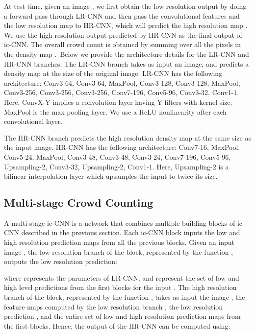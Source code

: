 \documentclass[runningheads]{llncs}
\begin{document}
At test time, given an image , we first obtain the low resolution output  by doing a forward pass through LR-CNN and then pass the convolutional features and the low resolution map  to HR-CNN, which will predict the high resolution map  . We use the high resolution output predicted by HR-CNN as the final output of ic-CNN. The overall crowd count is obtained by summing over all the pixels in the density map .\
\newline Below we provide the architecture details for the LR-CNN and HR-CNN branches.
\newline
{} The LR-CNN branch takes as input an image, and predicts a density map at  the size of the original image. LR-CNN has the following architecture:
Conv3-64, Conv3-64, MaxPool, Conv3-128, Conv3-128, MaxPool, Conv3-256, Conv3-256, Conv3-256, Conv7-196, Conv5-96, Conv3-32, Conv1-1. Here, ConvX-Y implies a convolution layer having Y filters with  kernel size. MaxPool is the max pooling layer. We use a ReLU nonlinearity after each convolutional layer.

The HR-CNN branch predicts the high resolution density map at the same size as the input image. HR-CNN has the following architecture:
Conv7-16, MaxPool, Conv5-24, MaxPool, Conv3-48, Conv3-48, Conv3-24, Conv7-196, Conv5-96, Upsampling-2, Conv3-32, Upsampling-2, Conv1-1. Here, Upsampling-2 is a bilinear interpolation layer which upsamples the input to twice its size.
\subsection{Multi-stage Crowd Counting}\label{sec:ic-CNN}
A multi-stage ic-CNN is a network that combines multiple building blocks of ic-CNN described in the previous section. Each ic-CNN block inputs the low and high resolution prediction maps from all the previous blocks. Given an input image , the low resolution branch of the  block, represented by the function , outputs the low resolution prediction:

where  represents the parameters of LR-CNN,  and  represent the set of low and high level predictions from the first  blocks for the input .
The high resolution branch of the  block, represented by the function , takes as input the image , the feature maps computed by the low resolution branch , the low resolution prediction , and the entire set of low and high resolution prediction maps from the first  blocks. Hence, the output of the  HR-CNN can be computed using: 
\end{document}
